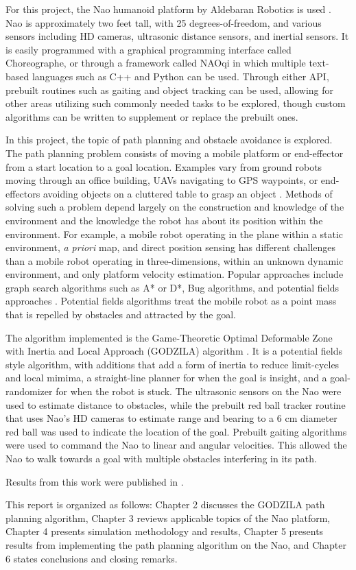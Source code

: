 For this project, the Nao humanoid platform by Aldebaran Robotics is used \cite{aldebaran1}. Nao is approximately two feet tall, with 25 degrees-of-freedom, and various sensors including HD cameras, ultrasonic distance sensors, and inertial sensors. It is easily programmed with a graphical programming interface called Choreographe, or through a framework called NAOqi in which multiple text-based languages such as C++ and Python can be used. Through either API, prebuilt routines such as gaiting and object tracking can be used, allowing for other areas utilizing such commonly needed tasks to be explored, though custom algorithms can be written to supplement or replace the prebuilt ones.

In this project, the topic of path planning and obstacle avoidance is explored.
The path planning problem consists of moving a mobile platform or end-effector from a start location to a goal location.
Examples vary from ground robots moving through an office building, UAVs navigating to GPS waypoints, or end-effectors avoiding objects on a cluttered table to grasp an object \cite{path2}.
Methods of solving such a problem depend largely on the construction and knowledge of the environment and the knowledge the robot has about its position within the environment. For example, a mobile robot operating in the plane within a static environment, \textit{a priori} map, and direct position sensing has different challenges than a mobile robot operating in three-dimensions, within an unknown dynamic environment, and only platform velocity estimation.
Popular approaches include graph search algorithms such as A* or D*, Bug algorithms, and potential fields approaches \cite{path3}. Potential fields algorithms treat the mobile robot as a point mass that is repelled by obstacles and attracted by the goal. 

The algorithm implemented is the Game-Theoretic Optimal Deformable Zone with Inertia and Local Approach (GODZILA) algorithm \cite{KK05b_jirs}. It is a potential fields style algorithm, with additions that add a form of inertia to reduce limit-cycles and local mimima, a straight-line planner for when the goal is insight, and a goal-randomizer for when the robot is stuck. The ultrasonic sensors on the Nao were used to estimate distance to obstacles, while the prebuilt red ball tracker routine that uses Nao's HD cameras to estimate range and bearing to a 6 cm diameter red ball was used to indicate the location of the goal. Prebuilt gaiting algorithms were used to command the Nao to linear and angular velocities. This allowed the Nao to walk towards a goal with multiple obstacles interfering in its path.

Results from this work were published in \cite{our_paper1}.

This report is organized as follows: Chapter 2 discusses the GODZILA path planning algorithm, Chapter 3 reviews applicable topics of the Nao platform, Chapter 4 presents simulation methodology and results, Chapter 5 presents results from implementing the path planning algorithm on the Nao, and Chapter 6 states conclusions and closing remarks.



